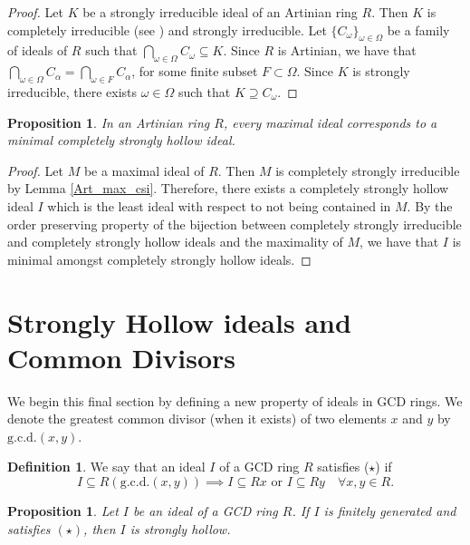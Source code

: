 \documentclass[11pt,english]{amsart}
\newtheorem{proposition}[theorem]{Proposition}
\theoremstyle{definition}
\newtheorem{definition}{Definition}[section]
\numberwithin{equation}{section}
\theoremstyle{remark}
\begin{document}
\begin{proof}
    Let $K$ be a strongly irreducible ideal of an Artinian ring $R$. Then $K$ is completely irreducible (see \cite[page~1]{FHO}) and strongly irreducible.
   Let $\{C_\omega\}_{\omega \in \Omega}$ be a family of ideals of $R$ such that $\bigcap_{\omega\in\Omega}C_\omega\subseteq K$. Since $R$ is Artinian, we have that $\bigcap_{\omega\in\Omega}C_\alpha=\bigcap_{\omega\in F}C_\alpha$, for some finite subset $F\subset\Omega$. Since $K$ is strongly irreducible,  there exists $\omega \in \Omega $ such that $K\supseteq C_\omega$. 
\end{proof}

\begin{proposition}
    In  an Artinian ring $R$, every maximal ideal  corresponds to a minimal completely strongly hollow ideal.
\end{proposition}

\begin{proof}
    Let $M$ be a maximal ideal of $R$. Then $M$ is completely strongly irreducible by Lemma \ref{Art_max_csi}. Therefore, there exists a completely strongly hollow ideal $I$ which is the least ideal with respect to not being contained in $M$. By the order preserving property of the bijection between completely strongly irreducible and completely strongly hollow ideals and the maximality of $M$, we have that $I$ is minimal amongst completely strongly hollow ideals. 
\end{proof}

\smallskip
\section{Strongly Hollow ideals and Common Divisors}
\label{4}
We begin this final section by defining a new property of ideals in GCD rings. We denote the greatest common divisor (when it exists) of two elements $x$ and $y$ by $\mathrm{g.c.d.}(x,y)$. 

\begin{definition}
    We say that an ideal $I$ of a GCD ring $R$ satisfies ($\star$) if \[I\subseteq R(\mathrm{g.c.d.}(x,y))\implies I\subseteq Rx \text{ or } I\subseteq Ry \quad \forall x,y\in R.\]
\end{definition}

\begin{proposition}
    Let $I$ be an ideal of a GCD ring $R$. If $I$ is finitely generated and satisfies $(\star)$, then $I$ is strongly hollow. 
\end{proposition}
\end{document}

